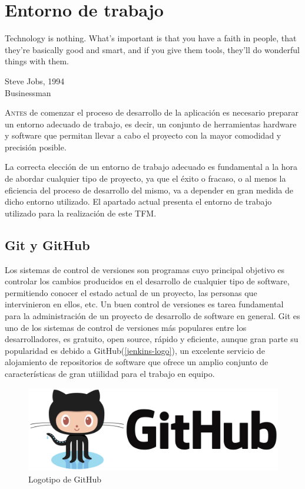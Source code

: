 \chapter{Entorno de trabajo}\label{chp-03}
\epigraph{Technology is nothing. What's important is that you have a faith in people, that they're basically good and smart, and if you give them tools, they'll do wonderful things with them.}{Steve Jobs, 1994\\Businessman}

\lettrine[lraise=-0.1, lines=2, loversize=0.2]{A}{ntes} de comenzar el proceso de desarrollo de la aplicación es necesario preparar un entorno adecuado de trabajo, es decir, un conjunto de herramientas hardware y software que permitan llevar a cabo el proyecto con la mayor comodidad y precisión posible.

La correcta elección de un entorno de trabajo adecuado es fundamental a la hora de abordar cualquier tipo de proyecto, ya que el éxito o fracaso, o al menos la eficiencia del proceso de desarrollo del mismo, va a depender en gran medida de dicho entorno utilizado.
El apartado actual presenta el entorno de trabajo utilizado para la realización de este \gls{TFM}.

\section{Git y GitHub}

Los sistemas de control de versiones son programas cuyo principal objetivo es controlar los cambios producidos en el desarrollo de cualquier tipo de software, permitiendo conocer el estado actual de un proyecto, las personas que intervinieron en ellos, etc. Un buen control de versiones es tarea fundamental para la administración de un proyecto de desarrollo de software en general\cite{alcazar2014}. Git es uno de los sistemas de control de versiones más populares entre los desarrolladores, es gratuito, open source, rápido y eficiente, aunque gran parte su popularidad es debido a GitHub(\autoref{jenkins-logo}), un excelente servicio de alojamiento de repositorios de software que ofrece un amplio conjunto de características de gran utiilidad para el trabajo en equipo.

\begin{figure}[htbp]
	\centering
	\includegraphics[width=0.80\linewidth]
	{entorno/figuras/github.png}
	\caption{Logotipo de GitHub}
	\label{github-logo}
\end{figure}

